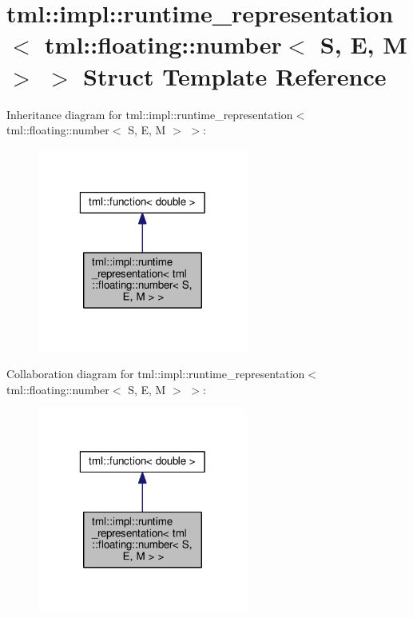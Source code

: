 \hypertarget{structtml_1_1impl_1_1runtime__representation_3_01tml_1_1floating_1_1number_3_01_s_00_01_e_00_01_m_01_4_01_4}{\section{tml\+:\+:impl\+:\+:runtime\+\_\+representation$<$ tml\+:\+:floating\+:\+:number$<$ S, E, M $>$ $>$ Struct Template Reference}
\label{structtml_1_1impl_1_1runtime__representation_3_01tml_1_1floating_1_1number_3_01_s_00_01_e_00_01_m_01_4_01_4}
}


Inheritance diagram for tml\+:\+:impl\+:\+:runtime\+\_\+representation$<$ tml\+:\+:floating\+:\+:number$<$ S, E, M $>$ $>$\+:
\nopagebreak
\begin{figure}[H]
\begin{center}
\leavevmode
\includegraphics[width=196pt]{structtml_1_1impl_1_1runtime__representation_3_01tml_1_1floating_1_1number_3_01_s_00_01_e_00_01_m_01_4_01_4__inherit__graph}
\end{center}
\end{figure}


Collaboration diagram for tml\+:\+:impl\+:\+:runtime\+\_\+representation$<$ tml\+:\+:floating\+:\+:number$<$ S, E, M $>$ $>$\+:
\nopagebreak
\begin{figure}[H]
\begin{center}
\leavevmode
\includegraphics[width=196pt]{structtml_1_1impl_1_1runtime__representation_3_01tml_1_1floating_1_1number_3_01_s_00_01_e_00_01_m_01_4_01_4__coll__graph}
\end{center}
\end{figure}
